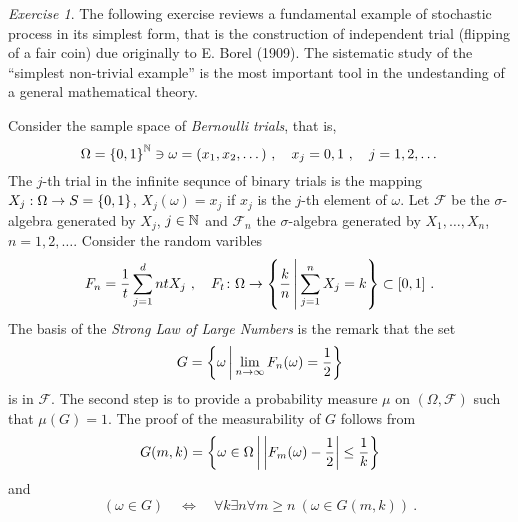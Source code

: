 \documentclass[12pt,a4paper]{amsart}
\theoremstyle{plain}
\theoremstyle{definition}
\theoremstyle{remark}
\newtheorem{exercise}[theorem]{Exercise}
\begin{document}
  \begin{exercise} The following exercise reviews a fundamental
    example of stochastic process in its simplest form, that is the
    construction of independent trial (flipping of a fair coin) due
    originally to E. Borel (1909). The sistematic study of the
    ``simplest non-trivial example'' is the most important tool in the
    undestanding of a general mathematical theory.

    Consider the sample space of \emph{Bernoulli trials}, that is,
    \begin{equation*}
      \Omega = \left\{0,1\right\}^{\mathbb{N}} \ni \omega = (x_1,x_2, \dots) \ ,
      \quad x_j = 0,1 \ , \quad j=1,2,\dots
    \end{equation*}
    The $j$-th trial in the infinite sequnce of binary trials is the
    mapping $X_j : \Omega \to S=\left\{0,1\right\}$, $X_j(\omega) = x_j$ if
    $x_j$ is the $j$-th element of $\omega$. Let $\mathcal F$ be the
    $\sigma$-algebra generated by $X_j$, $j \in \mathbb{N}$ and
    $\mathcal F_n$ the $\sigma$-algebra generated by $X_1,\dots,X_n$,
    $n=1,2,\dots$. Consider the random varibles
    \begin{equation*}
      F_n = \frac 1 t \sum_{j=1}^dnt X_j \ , \quad F_t \colon \Omega \to
      \left\{\frac k n \, \middle| \, \sum_{j=1}^n X_j = k \right\} \subset [0,1] \ .
    \end{equation*}
    The basis of the \emph{Strong Law of Large Numbers} is the remark
    that the set
\begin{equation*}
  G = \left\{\omega \, \middle| \, \lim_{n\to\infty} F_n(\omega) = \frac 12 \right\}
\end{equation*}
is in $\mathcal F$. The second step is to provide a probability
measure $\mu$ on $(\Omega,\mathcal F)$ such that $\mu(G) = 1$. The
proof of the measurability of $G$ follows from
\begin{equation*}
  G(m,k) = \left\{\omega \in \Omega \, \middle| \, \left\vert F_m(\omega) - \frac12 \right\vert \leq
    \frac 1k \right\}
\end{equation*}
and
\begin{equation*}
  (\omega \in G) \quad \Leftrightarrow \quad \forall k \exists n \forall
  m \geq n \ (\omega \in G(m,k)) \ . 
\end{equation*}



\end{exercise}
\end{document}
